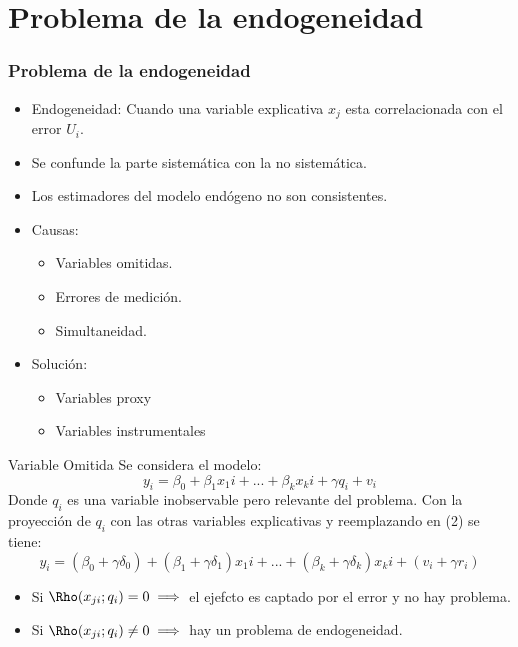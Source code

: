 \documentclass{beamer}
\begin{document}
\section{Problema de la endogeneidad}

\begin{frame}[fragile]
\frametitle{Problema de la endogeneidad}

\begin{itemize}
\item Endogeneidad: Cuando una variable explicativa $x_{j}$ esta correlacionada con el error $U_i$. 
\item Se confunde la parte sistem\'atica con la no sistem\'atica.
\item Los estimadores del modelo end\'ogeno no son consistentes.
\item Causas:
\begin{itemize}
    \item Variables omitidas.
    \item Errores de medici\'on.
    \item Simultaneidad.
\end{itemize}
\item Solución:
\begin{itemize}
    \item Variables proxy
    \item Variables instrumentales
\end{itemize}
\end{itemize}
\end{frame}

\begin{frame}{Variable Omitida}
Se considera el modelo:
\begin{equation}
     y_i = \beta_0 + \beta_1 x_1i  +...+ \beta_k x_ki+\gamma q_i + v_i
\end{equation}
Donde $q_i$ es una variable inobservable pero relevante del problema.
Con la proyección de $q_i$ con las otras variables explicativas y reemplazando en (2) se tiene:
\begin{equation}
     y_i = (\beta_0+\gamma\delta_0) + (\beta_1+\gamma\delta_1) x_1i  +...+ (\beta_k+\gamma\delta_k) x_ki+ (v_i+\gamma r_i)
\end{equation}
\begin{itemize}
    \item Si $\Rho(x_{ji};q_i)=0 \implies$ el ejefcto es captado por el error y no hay problema.
    \item Si $\Rho(x_{ji};q_i) \neq 0 \implies$ hay un problema de endogeneidad.
\end{itemize}
\end{frame}
\end{document}
